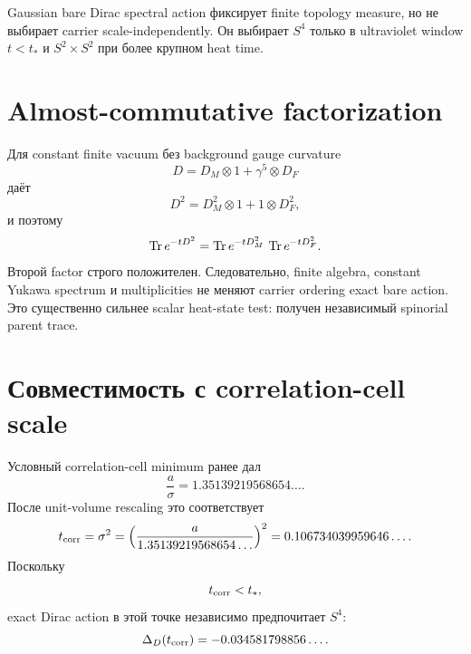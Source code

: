 \begin{theorem}
Gaussian bare Dirac spectral action фиксирует finite topology measure, но
не выбирает carrier scale-independently. Он выбирает \(S^4\) только в
ultraviolet window \(t<t_*\) и \(S^2\times S^2\) при более крупном heat
time.
\end{theorem}

\section{Almost-commutative factorization}

Для constant finite vacuum без background gauge curvature
\begin{equation}
 D=D_M\otimes1+\gamma^5\otimes D_F
\end{equation}
даёт
\begin{equation}
 D^2=D_M^2\otimes1+1\otimes D_F^2,
\end{equation}
и поэтому
\begin{equation}
 \operatorname{Tr} e^{-tD^2}
 =\operatorname{Tr} e^{-tD_M^2}\,
  \operatorname{Tr} e^{-tD_F^2}.
 \label{eq:almost-commutative-heat-factorization}
\end{equation}
Второй factor строго положителен. Следовательно, finite algebra, constant
Yukawa spectrum и multiplicities не меняют carrier ordering exact bare
action. Это существенно сильнее scalar heat-state test: получен независимый
spinorial parent trace.

\section{Совместимость с correlation-cell scale}

Условный correlation-cell minimum ранее дал
\begin{equation}
 \frac a\sigma=1.35139219568654\ldots.
\end{equation}
После unit-volume rescaling это соответствует
\begin{equation}
 t_{\rm corr}=\sigma^2
 =\left(\frac{a}{1.35139219568654\ldots}\right)^2
 =0.106734039959646\ldots.
\end{equation}
Поскольку
\begin{equation}
 t_{\rm corr}<t_*,
\end{equation}
exact Dirac action в этой точке независимо предпочитает \(S^4\):
\begin{equation}
 \Delta_D(t_{\rm corr})=-0.034581798856\ldots.
\end{equation}

